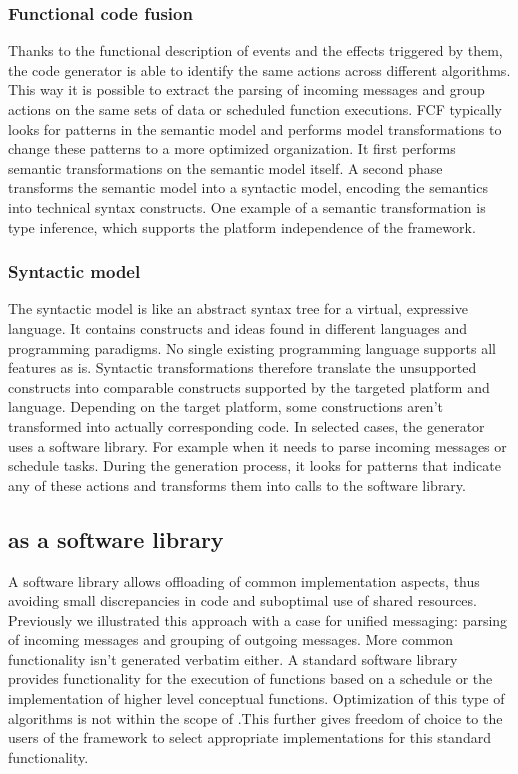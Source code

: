 \documentclass[3p,times,procedia]{elsarticle}
\begin{document}
\subsubsection{Functional code fusion}

Thanks to the functional description of events and the effects triggered by
them, the code generator is able to identify the same actions across different
algorithms. This way it is possible to extract the parsing of incoming messages
and group actions on the same sets of data or scheduled function executions.
FCF typically looks for patterns in the semantic model and performs model
transformations to change these patterns to a more optimized organization. It
first performs semantic transformations on the semantic model itself. A second
phase transforms the semantic model into a syntactic model, encoding the
semantics into technical syntax constructs. One example of a semantic
transformation is type inference, which supports the platform independence of
the framework.

\subsubsection{Syntactic model}

The syntactic model is like an abstract syntax tree for a virtual, expressive
language. It contains constructs and ideas found in different languages and
programming paradigms. No single existing programming language supports all
features as is. Syntactic transformations therefore translate the unsupported
constructs into comparable constructs supported by the targeted platform and
language. Depending on the target platform, some constructions aren't
transformed into actually corresponding code. In selected cases, the generator
uses a software library. For example when it needs to parse incoming messages
or schedule tasks. During the generation process, it looks for patterns that
indicate any of these actions and transforms them into calls to the \FOO
software library.

\subsection{\FOO as a software library}
\label{software-lib-design}

A software library allows offloading of common implementation aspects, thus
avoiding small discrepancies in code and suboptimal use of shared resources.
Previously we illustrated this approach with a case for unified messaging:
parsing of incoming messages and grouping of outgoing messages. More common
functionality isn't generated verbatim either. A standard software library
provides functionality for the execution of functions based on a schedule or
the implementation of higher level conceptual functions. Optimization of this
type of algorithms is not within the scope of \FOO.\@ This further gives
freedom of choice to the users of the framework to select appropriate
implementations for this standard functionality.
\end{document}
